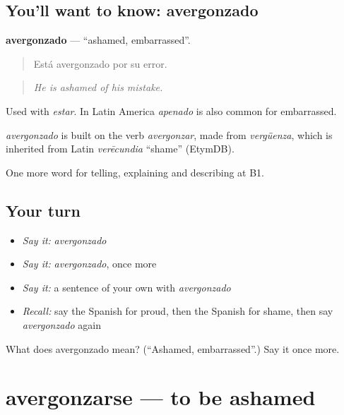 \subsection*{You'll want to know: avergonzado}
\textbf{avergonzado} — \textquotedblleft{}ashamed, embarrassed\textquotedblright{}.

\begin{quote}
Está avergonzado por su error.
\end{quote}

\begin{quote}
\emph{He is ashamed of his mistake.}
\end{quote}

Used with \emph{estar}. In Latin America \emph{apenado} is also common for embarrassed.

\begin{cousinweb}
\emph{avergonzado} is built on the verb \emph{avergonzar}, made from \emph{vergüenza}, which is inherited from Latin \emph{verēcundia} \textquotedblleft{}shame\textquotedblright{} (EtymDB).
\end{cousinweb}

\begin{grammarlens}[title={What you've built}]
One more word for telling, explaining and describing at B1.
\end{grammarlens}

\subsection*{Your turn}
\begin{itemize}
\raggedright
  \item \emph{Say it:} \emph{avergonzado}
  \item \emph{Say it:} \emph{avergonzado}, once more
  \item \emph{Say it:} a sentence of your own with \emph{avergonzado}
  \item \emph{Recall:} say the Spanish for proud, then the Spanish for shame, then say \emph{avergonzado} again
\end{itemize}

\begin{tcolorbox}[breakable,colback=teal!4,colframe=teal!35!black,title={Before you move on}]
What does avergonzado mean? (\textquotedblleft{}Ashamed, embarrassed\textquotedblright{}.) Say it once more.
\end{tcolorbox}
\section[avergonzarse]{avergonzarse — to be ashamed}

